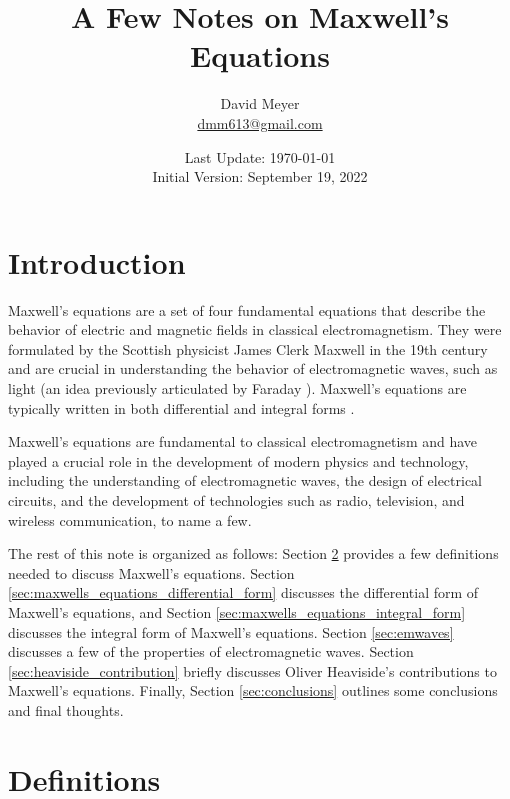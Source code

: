 \documentclass{article}
\title{A Few Notes on Maxwell's Equations}
\author{David Meyer \\ 
	{\small \vspace{-2.75mm} \href{mailto:dmm613@gmail.com}{dmm613@gmail.com}}}
\date{Last Update: \today \\
	{\small \vspace{1.00mm} Initial Version: September 19, 2022}}
\theoremstyle{definition}
\begin{document}
\maketitle
%
%
\def \vE{\mathbf{E}}
\def \vB{\mathbf{B}}
\def \vJ{\mathbf{J}}
\def \vi{\mathbf{\hat{i}}}
\def \vj{\mathbf{\hat{j}}}
\def \vk{\mathbf{\hat{k}}}
%
%
%
\section{Introduction}
\label{sec:introduction}
Maxwell's equations are a set of four fundamental equations that
describe the behavior of electric and magnetic fields in
classical electromagnetism. They were formulated by the Scottish
physicist James Clerk Maxwell in the 19th century and are crucial
in understanding the behavior of electromagnetic waves, such as
light (an idea previously articulated by Faraday
\cite{faraday_and_the_em_theory_of_light}). Maxwell's equations
are typically written in both differential and integral forms
\cite{wikipedia:maxwells_equations}.

\bigskip
\noindent
Maxwell's equations are fundamental to classical electromagnetism
and have played a crucial role in the development of modern
physics and technology, including the understanding of
electromagnetic waves, the design of electrical circuits, and the
development of technologies such as radio, television, and
wireless communication, to name a few.

\bigskip
\noindent
The rest of this note is organized as follows: Section
\ref{sec:definitions} provides a few definitions needed to
discuss Maxwell's equations. Section
\ref{sec:maxwells_equations_differential_form} discusses the
differential form of Maxwell's equations, and Section
\ref{sec:maxwells_equations_integral_form} discusses the integral
form of Maxwell's equations. Section \ref{sec:emwaves} discusses
a few of the properties of electromagnetic waves. Section 
\ref{sec:heaviside_contribution} briefly discusses Oliver
Heaviside's contributions to Maxwell's equations. Finally,
Section \ref{sec:conclusions} outlines some conclusions and final
thoughts.
%
%
%
\section{Definitions}
\label{sec:definitions}
\end{document}
